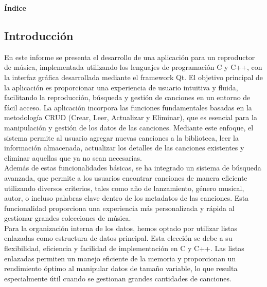 \documentclass[corference]{IEEEtran}
\begin{document}
    \renewcommand{\contentsname}{}
    
    \begin{center}
        \textbf{\huge Índice} %
    \end{center}
    
    \tableofcontents
    
    \newpage
    \setlength{\parindent}{4em}
    \newpage
    \begin{flushleft}
        \section{Introducción}
        \noindent\hspace*{4em}En este informe se presenta el desarrollo de una aplicación para un reproductor de música, implementada utilizando los lenguajes de programación C y C++, con la interfaz gráfica desarrollada mediante el framework Qt. El objetivo principal de la aplicación es proporcionar una experiencia de usuario intuitiva y fluida, facilitando la reproducción, búsqueda y gestión de canciones en un entorno de fácil acceso. La aplicación incorpora las funciones fundamentales basadas en la metodología CRUD (Crear, Leer, Actualizar y Eliminar), que es esencial para la manipulación y gestión de los datos de las canciones. Mediante este enfoque, el sistema permite al usuario agregar nuevas canciones a la biblioteca, leer la información almacenada, actualizar los detalles de las canciones existentes y eliminar aquellas que ya no sean necesarias.\\
    
        \noindent\hspace*{4em}Además de estas funcionalidades básicas, se ha integrado un sistema de búsqueda avanzada, que permite a los usuarios encontrar canciones de manera eficiente utilizando diversos criterios, tales como año de lanzamiento, género musical, autor, o incluso palabras clave dentro de los metadatos de las canciones. Esta funcionalidad proporciona una experiencia más personalizada y rápida al gestionar grandes colecciones de música.\\
    
        \noindent\hspace*{4em}Para la organización interna de los datos, hemos optado por utilizar listas enlazadas como estructura de datos principal. Esta elección se debe a su flexibilidad, eficiencia y facilidad de implementación en C y C++. Las listas enlazadas permiten un manejo eficiente de la memoria y proporcionan un rendimiento óptimo al manipular datos de tamaño variable, lo que resulta especialmente útil cuando se gestionan grandes cantidades de canciones.\\
    

\end{flushleft}
\end{document}
